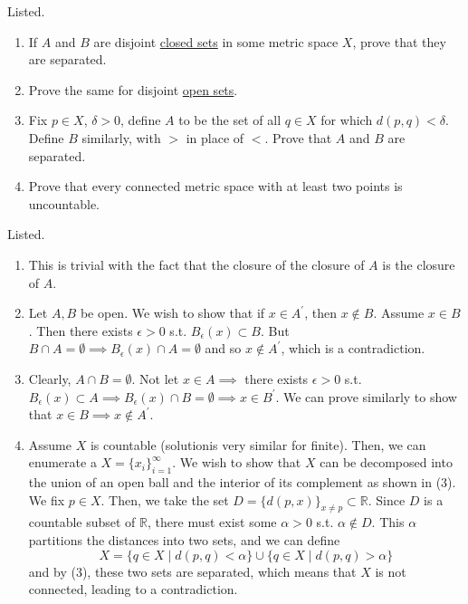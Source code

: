   \begin{exercise}[Rudin 2.19]
    Listed. 
    \begin{enumerate}
        \item If $A$ and $B$ are disjoint \hyperref[pst-def:closed]{closed sets} in some metric space $X$, prove that they are separated. 
        \item Prove the same for disjoint \hyperref[pst-def:open-set]{open sets}. 
        \item Fix $p \in X$, $\delta > 0$, define $A$ to be the set of all $q \in X$ for which $d(p, q) < \delta$. Define $B$ similarly, with $>$ in place of $<$. Prove that $A$ and $B$ are separated. 
        \item Prove that every connected metric space with at least two points is uncountable. 
    \end{enumerate}
  \end{exercise}
  \begin{solution}
    Listed. 
    \begin{enumerate}
      \item This is trivial with the fact that the closure of the closure of $A$ is the closure of $A$. 
      \item Let $A, B$ be open. We wish to show that if $x \in A^\prime$, then $x \not\in B$. Assume $x \in B$. Then there exists $\epsilon > 0$ s.t. $B_\epsilon (x) \subset B$. But $B \cap A = \emptyset \implies B_\epsilon (x) \cap A = \emptyset$ and so $x \not\in A^\prime$, which is a contradiction. 

      \item Clearly, $A \cap B = \emptyset$. Not let $x \in A \implies$ there exists $\epsilon > 0$ s.t. $B_\epsilon (x) \subset A \implies B_\epsilon (x) \cap B = \emptyset \implies x \in B^\prime$. We can prove similarly to show that $x \in B \implies x \not\in A^\prime$. 

      \item Assume $X$ is countable (solutionis very similar for finite). Then, we can enumerate a $X = \{x_i\}_{i=1}^\infty$. We wish to show that $X$ can be decomposed into the union of an open ball and the interior of its complement as shown in (3). We fix $p \in X$. Then, we take the set $D = \{d(p, x)\}_{x \neq p} \subset \mathbb{R}$. Since $D$ is a countable subset of $\mathbb{R}$, there must exist some $\alpha > 0$ s.t. $\alpha \not\in D$. This $\alpha$ partitions the distances into two sets, and we can define 
        \begin{equation}
          X = \{q \in X \mid d(p, q) < \alpha\} \cup \{q \in X \mid d(p, q) > \alpha\}
        \end{equation}
        and by (3), these two sets are separated, which means that $X$ is not connected, leading to a contradiction. 
    \end{enumerate}
  \end{solution}

